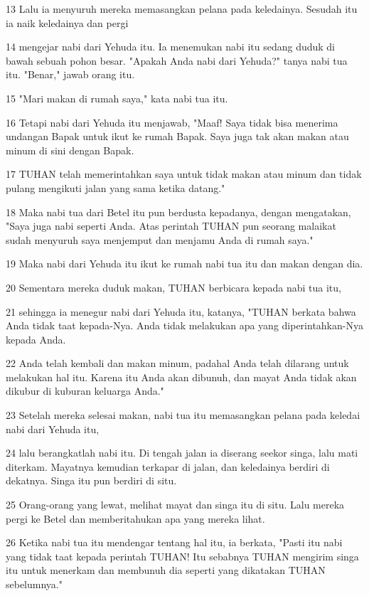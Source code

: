 \par 13 Lalu ia menyuruh mereka memasangkan pelana pada keledainya. Sesudah itu ia naik keledainya dan pergi
\par 14 mengejar nabi dari Yehuda itu. Ia menemukan nabi itu sedang duduk di bawah sebuah pohon besar. "Apakah Anda nabi dari Yehuda?" tanya nabi tua itu. "Benar," jawab orang itu.
\par 15 "Mari makan di rumah saya," kata nabi tua itu.
\par 16 Tetapi nabi dari Yehuda itu menjawab, "Maaf! Saya tidak bisa menerima undangan Bapak untuk ikut ke rumah Bapak. Saya juga tak akan makan atau minum di sini dengan Bapak.
\par 17 TUHAN telah memerintahkan saya untuk tidak makan atau minum dan tidak pulang mengikuti jalan yang sama ketika datang."
\par 18 Maka nabi tua dari Betel itu pun berdusta kepadanya, dengan mengatakan, "Saya juga nabi seperti Anda. Atas perintah TUHAN pun seorang malaikat sudah menyuruh saya menjemput dan menjamu Anda di rumah saya."
\par 19 Maka nabi dari Yehuda itu ikut ke rumah nabi tua itu dan makan dengan dia.
\par 20 Sementara mereka duduk makan, TUHAN berbicara kepada nabi tua itu,
\par 21 sehingga ia menegur nabi dari Yehuda itu, katanya, "TUHAN berkata bahwa Anda tidak taat kepada-Nya. Anda tidak melakukan apa yang diperintahkan-Nya kepada Anda.
\par 22 Anda telah kembali dan makan minum, padahal Anda telah dilarang untuk melakukan hal itu. Karena itu Anda akan dibunuh, dan mayat Anda tidak akan dikubur di kuburan keluarga Anda."
\par 23 Setelah mereka selesai makan, nabi tua itu memasangkan pelana pada keledai nabi dari Yehuda itu,
\par 24 lalu berangkatlah nabi itu. Di tengah jalan ia diserang seekor singa, lalu mati diterkam. Mayatnya kemudian terkapar di jalan, dan keledainya berdiri di dekatnya. Singa itu pun berdiri di situ.
\par 25 Orang-orang yang lewat, melihat mayat dan singa itu di situ. Lalu mereka pergi ke Betel dan memberitahukan apa yang mereka lihat.
\par 26 Ketika nabi tua itu mendengar tentang hal itu, ia berkata, "Pasti itu nabi yang tidak taat kepada perintah TUHAN! Itu sebabnya TUHAN mengirim singa itu untuk menerkam dan membunuh dia seperti yang dikatakan TUHAN sebelumnya."
